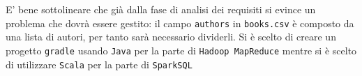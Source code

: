 \documentclass[11pt]{article}
\begin{document}
E' bene sottolineare che già dalla fase di analisi dei requisiti si evince un problema che dovrà essere gestito: il campo
\texttt{authors} in \texttt{books.csv} è composto da una lista di autori, per tanto sarà necessario dividerli.
Si è scelto di creare un progetto \texttt{gradle} usando \texttt{Java} per la parte di
\texttt{Hadoop MapReduce} mentre si è scelto di utilizzare \texttt{Scala} per la parte di \texttt{SparkSQL}

\newpage


\newpage



\newpage
    
\end{document}
